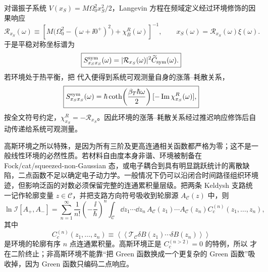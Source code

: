 对谐振子系统 $V(x_S)=M\Omega_0^2x_S^2/2$，Langevin 方程在频域定义经过环境修饰的因果响应
\begin{equation}
\boxed{
\mathcal R_{x_S}(\omega)
\equiv\left[
M\bigl(\Omega_0^2-(\omega+\ii0^+)^2\bigr)
+\chi_B^R(\omega)
\right]^{-1},
\qquad
x_S(\omega)=\mathcal R_{x_S}(\omega)\xi(\omega).}
\label{eq:dressed_oscillator_retarded_response}
\end{equation}
于是平稳对称坐标谱为
\begin{equation}
\boxed{
S_{x_Sx_S}^{\rm sym}(\omega)
=|\mathcal R_{x_S}(\omega)|^2\widetilde C_{\rm sym}(\omega).}
\label{eq:dressed_coordinate_spectrum_dp68}
\end{equation}
若环境处于热平衡，把 代入便得到系统可观测量自身的涨落--耗散关系，
\begin{equation}
\boxed{
S_{x_Sx_S}^{\rm sym}(\omega)
=\hbar\coth\!\left(\frac{\beta_T\hbar\omega}{2}\right)
[-\operatorname{Im}\chi_{x_S}^R(\omega)],}
\label{eq:dressed_system_fdt_from_bath_fdt}
\end{equation}
按全文符号约定，$\chi_{x_S}^R=-\mathcal R_{x_S}$。因此环境的涨落--耗散关系经过推迟响应修饰后自动传递给系统可观测量。

高斯环境之所以特殊，是因为所有三阶及更高连通相关函数都严格为零；这不是一般线性环境的必然性质。若材料自由度本身非谐、环境被制备在 Fock/cat/squeezed-non-Gaussian 态，或电子耦合到具有明显跳跃统计的离散缺陷，二点函数不足以确定电子动力学。一般情况下仍可以沿闭合时间路径组织环境迹，但影响泛函的对数必须保留完整的连通累积量层级。把两条 Keldysh 支路统一记作轮廓变量 $z\in\mathcal C$，并把支路方向符号吸收到轮廓源 $A_{\mathcal C}(z)$ 中，则
\begin{equation}
\boxed{
\ln\mathscr I[A_+,A_-]
=\sum_{n=1}^{\infty}
\frac1{n!}
\left(-\frac{\ii}{\hbar}\right)^n
\int_{\mathcal C}\dd z_1\cdots\dd z_n\,
A_{\mathcal C}(z_1)\cdots A_{\mathcal C}(z_n)
C_c^{(n)}(z_1,\ldots,z_n),}
\label{eq:non_gaussian_influence_cumulant_hierarchy}
\end{equation}
其中
\[
C_c^{(n)}(z_1,\ldots,z_n)
\equiv
\left\langle\!\left\langle
\mathcal T_{\mathcal C}
\delta B(z_1)\cdots\delta B(z_n)
\right\rangle\!\right\rangle
\]
是环境的轮廓有序 $n$ 点连通累积量。高斯环境正是
$C_c^{(n>2)}=0$ 的特例，所以 才在二阶终止；非高斯环境不能靠“把 Green 函数换成一个更复杂的 Green 函数”吸收掉，因为 Green 函数只编码二点响应。

